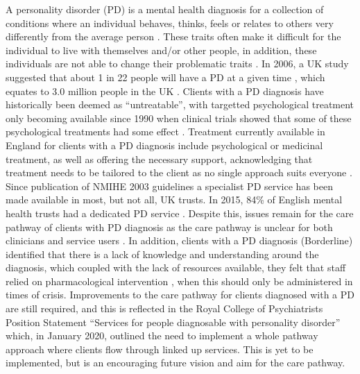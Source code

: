 \documentclass{article}
\begin{document}
A personality disorder (PD) is a mental health diagnosis for a collection of conditions where an individual behaves, thinks, feels or relates to others very differently from the average person \cite{NHS}. These traits often make it difficult for the individual to live with themselves and/or other people, in addition, these individuals are not able to change their problematic traits \cite{RoyalCollegeofPsychiatrists2015}. In 2006, a UK study suggested that about 1 in 22 people will have a PD at a given time \cite{Coid2006}, which equates to 3.0 million people in the UK \cite{OfficeforNationalStatistics2017}. Clients with a PD diagnosis have historically been deemed as “untreatable”, with targetted psychological treatment only becoming available since 1990 when clinical trials showed that some of these psychological treatments had some effect \cite{Pollack1990, LinehanMMArmstrongHESuarezAAllmonD1991}. Treatment currently available in England for clients with a PD diagnosis include psychological or medicinal treatment, as well as offering the necessary support, acknowledging that treatment needs to be tailored to the client as no single approach suits everyone \cite{NHS}. Since publication of NMIHE 2003 guidelines \cite{NationalInstitueforMentalHealthinEngland2003} a specialist PD service has been made available in most, but not all, UK trusts. In 2015, 84\% of English mental health trusts had a dedicated PD service \cite{Dale2017}. Despite this, issues remain for the care pathway of clients with PD diagnosis as the care pathway is unclear for both clinicians and service users  \cite{FlynnSRaphaelJGraneyJNyathiTWilliamsAKapurNApplebyLShaw2019}. In addition, clients with a PD diagnosis (Borderline) identified that there is a lack of knowledge and understanding around the diagnosis, which coupled with the lack of resources available, they felt that staff relied on pharmacological intervention \cite{Rogers2011}, when this should only be administered in times of crisis. Improvements to the care pathway for clients diagnosed with a PD are still required, and this is reflected in the Royal College of Psychiatrists Position Statement “Services for people diagnosable with personality disorder” \cite{RoyalCollegeofPsychiatrists2020} which, in January 2020, outlined the need to implement a whole pathway approach where clients flow through linked up services. This is yet to be implemented, but is an encouraging future vision and aim for the care pathway.
\end{document}
